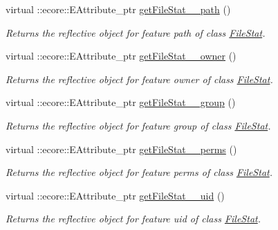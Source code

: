\begin{DoxyCompactItemize}
virtual ::ecore::EAttribute\_\-ptr \hyperlink{classFMS__Data_1_1FMS__DataPackage_a6bb709a2ef763fb1a764103b465171da}{getFileStat\_\-\_\-path} ()
\begin{DoxyCompactList}\small\item\em Returns the reflective object for feature path of class \hyperlink{classFMS__Data_1_1FileStat}{FileStat}. \item\end{DoxyCompactList}\item 
virtual ::ecore::EAttribute\_\-ptr \hyperlink{classFMS__Data_1_1FMS__DataPackage_a5914d2c89189abe35ad61b5587796770}{getFileStat\_\-\_\-owner} ()
\begin{DoxyCompactList}\small\item\em Returns the reflective object for feature owner of class \hyperlink{classFMS__Data_1_1FileStat}{FileStat}. \item\end{DoxyCompactList}\item 
virtual ::ecore::EAttribute\_\-ptr \hyperlink{classFMS__Data_1_1FMS__DataPackage_a8f1c20637cf54b149f4d9246ecd4e6d7}{getFileStat\_\-\_\-group} ()
\begin{DoxyCompactList}\small\item\em Returns the reflective object for feature group of class \hyperlink{classFMS__Data_1_1FileStat}{FileStat}. \item\end{DoxyCompactList}\item 
virtual ::ecore::EAttribute\_\-ptr \hyperlink{classFMS__Data_1_1FMS__DataPackage_a05ca0f84c5652bc622a1574fcfe003ca}{getFileStat\_\-\_\-perms} ()
\begin{DoxyCompactList}\small\item\em Returns the reflective object for feature perms of class \hyperlink{classFMS__Data_1_1FileStat}{FileStat}. \item\end{DoxyCompactList}\item 
virtual ::ecore::EAttribute\_\-ptr \hyperlink{classFMS__Data_1_1FMS__DataPackage_af620b9b5cd78718b63a98944faa74876}{getFileStat\_\-\_\-uid} ()
\begin{DoxyCompactList}\small\item\em Returns the reflective object for feature uid of class \hyperlink{classFMS__Data_1_1FileStat}{FileStat}. \item\end{DoxyCompactList}\item 

\end{DoxyCompactItemize}
